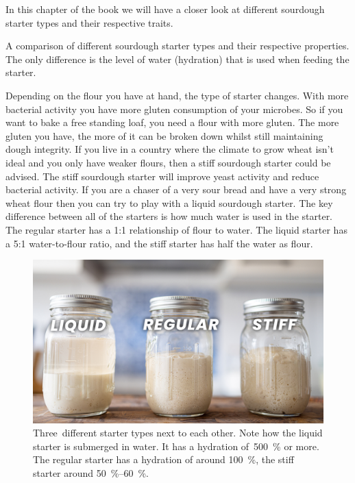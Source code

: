 \begin{quoting}
In this chapter of the book we will have a closer look
at different sourdough starter types and their respective
traits.
\end{quoting}

\begin{table}[htp!]
    \begin{center}
        
        \caption[Different types of sourdough]{A comparison of different
            sourdough starter types and their respective properties. The only
            difference is the level of water (hydration) that is used when
            feeding the starter.}%
        \label{tab:starter-types-comparison}
    \end{center}
\end{table}

Depending on the flour you have at hand, the type of starter changes. With more
bacterial activity you have more gluten consumption of your microbes. So if
you want to bake a free standing loaf, you need a flour with more gluten. The
more gluten you have, the more of it can be broken down whilst still maintaining
dough integrity. If you live in a country where the climate to grow wheat
isn't ideal and you only have weaker flours, then a stiff sourdough starter
could be advised. The stiff sourdough starter will improve yeast activity and
reduce bacterial activity. If you are a chaser of a very sour bread and have a
very strong wheat flour then you can try to play with a liquid sourdough
starter. The key difference between all of the starters is how much water
is used in the starter. The regular starter has a 1:1 relationship of flour
to water. The liquid starter has a 5:1 water-to-flour ratio, and the stiff
starter has half the water as flour.

\begin{figure}[!htb]
  \includegraphics[width=\textwidth]{sourdough-starter-types}
  \caption[Liquid, regular and stiff starter]{Three~different starter types
      next to each other. Note how the liquid starter is submerged in water.
      It has a hydration of~\qty{500}{\percent} or more.  The regular starter
      has a hydration of around \qty{100}{\percent}, the stiff starter around
      \qtyrange{50}{60}{\percent}.}%
  \label{fig:starter-types}
\end{figure}


